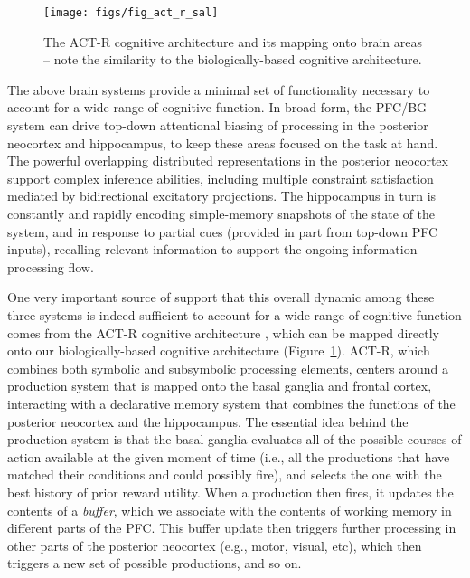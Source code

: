 \documentclass[11pt,twoside]{article}
\newif\myifpdf
\begin{document}
\begin{figure}
  \centering\texttt{[image: figs/fig\_act\_r\_sal]}
  \caption{\small The ACT-R cognitive architecture and its mapping onto brain areas -- note the similarity to the biologically-based cognitive architecture.}
  \label{fig.act-r}
\end{figure}

The above brain systems provide a minimal set of functionality necessary to account for a wide range of cognitive function.  In broad form, the PFC/BG system can drive top-down attentional biasing \cite{OReillyBraverCohen99,MillerCohen01} of processing in the posterior neocortex and hippocampus, to keep these areas focused on the task at hand.  The powerful overlapping distributed representations in the posterior neocortex support complex inference abilities, including multiple constraint satisfaction mediated by bidirectional excitatory projections.  The hippocampus in turn is constantly and rapidly encoding simple-memory snapshots of the state of the system, and in response to partial cues (provided in part from top-down PFC inputs), recalling relevant information to support the ongoing information processing flow.

One very important source of support that this overall dynamic among these three systems is indeed sufficient to account for a wide range of cognitive function comes from the ACT-R cognitive architecture \cite{AndersonBothellByrneEtAl04}, which can be mapped directly onto our biologically-based cognitive architecture \cite{JilkLebiereOReillyEtAl08} (Figure~\ref{fig.act-r}).  ACT-R, which combines both symbolic and subsymbolic processing elements, centers around a production system that is mapped onto the basal ganglia and frontal cortex, interacting with a declarative memory system that combines the functions of the posterior neocortex and the hippocampus. The essential idea behind the production system is that the basal ganglia evaluates all of the possible courses of action available at the given moment of time (i.e., all the productions that have matched their conditions and could possibly fire), and selects the one with the best history of prior reward utility.  When a production then fires, it updates the contents of a {\em buffer}, which we associate with the contents of working memory in different parts of the PFC.  This buffer update then triggers further processing in other parts of the posterior neocortex (e.g., motor, visual, etc), which then triggers a new set of possible productions, and so on.
\end{document}
